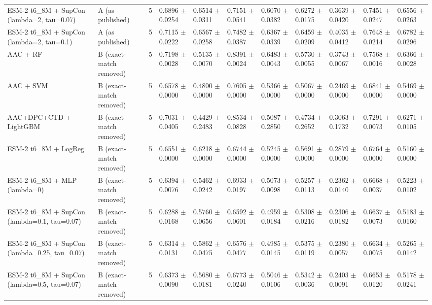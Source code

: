 \begin{table}[ht]
\begin{tabular}{lllllllllll}
ESM-2 t6\_8M + SupCon (lambda=2, tau=0.07) & A (as published) & 5 & 0.6896 $\pm$ 0.0254 & 0.6514 $\pm$ 0.0311 & 0.7151 $\pm$ 0.0541 & 0.6070 $\pm$ 0.0382 & 0.6272 $\pm$ 0.0175 & 0.3639 $\pm$ 0.0420 & 0.7451 $\pm$ 0.0247 & 0.6556 $\pm$ 0.0263 \\
ESM-2 t6\_8M + SupCon (lambda=2, tau=0.1) & A (as published) & 5 & 0.7115 $\pm$ 0.0222 & 0.6567 $\pm$ 0.0258 & 0.7482 $\pm$ 0.0387 & 0.6367 $\pm$ 0.0339 & 0.6459 $\pm$ 0.0209 & 0.4035 $\pm$ 0.0412 & 0.7648 $\pm$ 0.0214 & 0.6782 $\pm$ 0.0296 \\
AAC + RF & B (exact-match removed) & 5 & 0.7198 $\pm$ 0.0028 & 0.5135 $\pm$ 0.0070 & 0.8391 $\pm$ 0.0024 & 0.6483 $\pm$ 0.0043 & 0.5730 $\pm$ 0.0055 & 0.3743 $\pm$ 0.0067 & 0.7568 $\pm$ 0.0016 & 0.6366 $\pm$ 0.0028 \\
AAC + SVM & B (exact-match removed) & 5 & 0.6578 $\pm$ 0.0000 & 0.4800 $\pm$ 0.0000 & 0.7605 $\pm$ 0.0000 & 0.5366 $\pm$ 0.0000 & 0.5067 $\pm$ 0.0000 & 0.2469 $\pm$ 0.0000 & 0.6841 $\pm$ 0.0000 & 0.5469 $\pm$ 0.0000 \\
AAC+DPC+CTD + LightGBM & B (exact-match removed) & 5 & 0.7031 $\pm$ 0.0405 & 0.4429 $\pm$ 0.2483 & 0.8534 $\pm$ 0.0828 & 0.5087 $\pm$ 0.2850 & 0.4734 $\pm$ 0.2652 & 0.3063 $\pm$ 0.1732 & 0.7291 $\pm$ 0.0073 & 0.6271 $\pm$ 0.0105 \\
ESM-2 t6\_8M + LogReg & B (exact-match removed) & 5 & 0.6551 $\pm$ 0.0000 & 0.6218 $\pm$ 0.0000 & 0.6744 $\pm$ 0.0000 & 0.5245 $\pm$ 0.0000 & 0.5691 $\pm$ 0.0000 & 0.2879 $\pm$ 0.0000 & 0.6764 $\pm$ 0.0000 & 0.5160 $\pm$ 0.0000 \\
ESM-2 t6\_8M + MLP (lambda=0) & B (exact-match removed) & 5 & 0.6394 $\pm$ 0.0076 & 0.5462 $\pm$ 0.0242 & 0.6933 $\pm$ 0.0197 & 0.5073 $\pm$ 0.0098 & 0.5257 $\pm$ 0.0113 & 0.2362 $\pm$ 0.0140 & 0.6668 $\pm$ 0.0037 & 0.5223 $\pm$ 0.0102 \\
ESM-2 t6\_8M + SupCon (lambda=0.1, tau=0.07) & B (exact-match removed) & 5 & 0.6288 $\pm$ 0.0168 & 0.5760 $\pm$ 0.0656 & 0.6592 $\pm$ 0.0601 & 0.4959 $\pm$ 0.0184 & 0.5308 $\pm$ 0.0216 & 0.2306 $\pm$ 0.0182 & 0.6637 $\pm$ 0.0073 & 0.5183 $\pm$ 0.0160 \\
ESM-2 t6\_8M + SupCon (lambda=0.25, tau=0.07) & B (exact-match removed) & 5 & 0.6314 $\pm$ 0.0131 & 0.5862 $\pm$ 0.0475 & 0.6576 $\pm$ 0.0477 & 0.4985 $\pm$ 0.0145 & 0.5375 $\pm$ 0.0119 & 0.2380 $\pm$ 0.0057 & 0.6634 $\pm$ 0.0075 & 0.5265 $\pm$ 0.0142 \\
ESM-2 t6\_8M + SupCon (lambda=0.5, tau=0.07) & B (exact-match removed) & 5 & 0.6373 $\pm$ 0.0090 & 0.5680 $\pm$ 0.0181 & 0.6773 $\pm$ 0.0240 & 0.5046 $\pm$ 0.0106 & 0.5342 $\pm$ 0.0036 & 0.2403 $\pm$ 0.0091 & 0.6653 $\pm$ 0.0120 & 0.5178 $\pm$ 0.0241 \\

\end{tabular}
\end{table}
